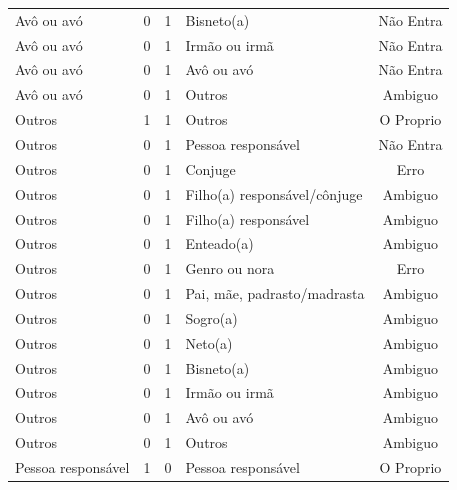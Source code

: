 \documentclass[
	12pt,				%
	openright,			%
	twoside,			%
	a4paper,			%
	english,			%
	french,				%
	spanish,			%
	brazil				%
	]{abntex2}
\begin{document}
\begin{anexosenv}
\begin{longtable}{@{}lcclc@{}}
Avô ou avó                   & 0         & 1        & Bisneto(a)                   & Não Entra       \\
Avô ou avó                   & 0         & 1        & Irmão ou irmã                & Não Entra       \\
Avô ou avó                   & 0         & 1        & Avô ou avó                   & Não Entra       \\
Avô ou avó                   & 0         & 1        & Outros                       & Ambiguo         \\
Outros                       & 1         & 1        & Outros                       & O Proprio       \\
Outros                       & 0         & 1        & Pessoa responsável           & Não Entra       \\
Outros                       & 0         & 1        & Conjuge                      & Erro            \\
Outros                       & 0         & 1        & Filho(a) responsável/cônjuge & Ambiguo         \\
Outros                       & 0         & 1        & Filho(a) responsável         & Ambiguo         \\
Outros                       & 0         & 1        & Enteado(a)                   & Ambiguo         \\
Outros                       & 0         & 1        & Genro ou nora                & Erro            \\
Outros                       & 0         & 1        & Pai, mãe, padrasto/madrasta  & Ambiguo         \\
Outros                       & 0         & 1        & Sogro(a)                     & Ambiguo         \\
Outros                       & 0         & 1        & Neto(a)                      & Ambiguo         \\
Outros                       & 0         & 1        & Bisneto(a)                   & Ambiguo         \\
Outros                       & 0         & 1        & Irmão ou irmã                & Ambiguo         \\
Outros                       & 0         & 1        & Avô ou avó                   & Ambiguo         \\
Outros                       & 0         & 1        & Outros                       & Ambiguo         \\
Pessoa responsável           & 1         & 0        & Pessoa responsável           & O Proprio       \\

\end{longtable}
\end{anexosenv}
\end{document}
